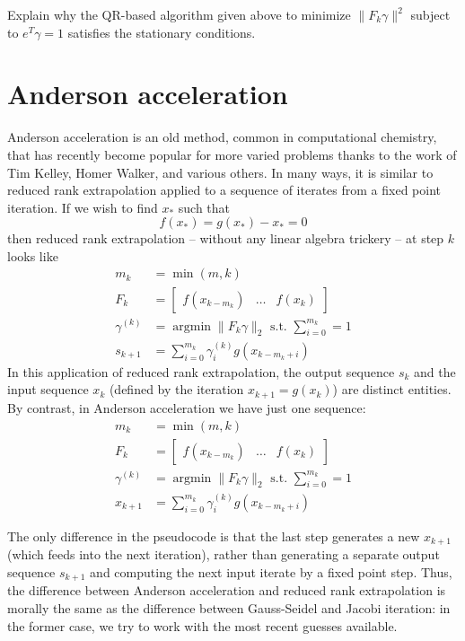 \documentclass[12pt, leqno]{article} %
\begin{document}
Explain why the QR-based algorithm given above to minimize
\(\|F_k \gamma\|^2\) subject to \(e^T \gamma = 1\) satisfies the
stationary conditions.

\section{Anderson acceleration}

Anderson acceleration is an old method, common in computational
chemistry, that has recently become popular for more varied problems
thanks to the work of Tim Kelley, Homer Walker, and various others. In
many ways, it is similar to reduced rank extrapolation applied to a
sequence of iterates from a fixed point iteration. If we wish to find
\(x_*\) such that \[f(x_*) = g(x_*)-x_* = 0\] then reduced rank
extrapolation -- without any linear algebra trickery -- at step \(k\)
looks like \begin{align*}
  m_k &= \min(m,k) \\
  F_k &= \begin{bmatrix} f(x_{k-m_k}) & \ldots & f(x_k) \end{bmatrix} \\
  \gamma^{(k)} &= \operatorname{argmin} \|F_k \gamma\|_2 \mbox{ s.t. } \sum_{i=0}^{m_k} = 1 \\
  s_{k+1} &= \sum_{i=0}^{m_k} \gamma_i^{(k)} g(x_{k-m_k+i})
\end{align*} In this application of reduced rank extrapolation, the
output sequence \(s_k\) and the input sequence \(x_k\) (defined by the
iteration \(x_{k+1} = g(x_k)\)) are distinct entities. By contrast, in
Anderson acceleration we have just one sequence: \begin{align*}
  m_k &= \min(m,k) \\
  F_k &= \begin{bmatrix} f(x_{k-m_k}) & \ldots & f(x_k) \end{bmatrix} \\
  \gamma^{(k)} &= \operatorname{argmin} \|F_k \gamma\|_2 \mbox{ s.t. } \sum_{i=0}^{m_k} = 1 \\
  x_{k+1} &= \sum_{i=0}^{m_k} \gamma_i^{(k)} g(x_{k-m_k+i})
\end{align*}

The only difference in the pseudocode is that the last step generates a
new \(x_{k+1}\) (which feeds into the next iteration), rather than
generating a separate output sequence \(s_{k+1}\) and computing the next
input iterate by a fixed point step. Thus, the difference between
Anderson acceleration and reduced rank extrapolation is morally the same
as the difference between Gauss-Seidel and Jacobi iteration: in the
former case, we try to work with the most recent guesses available.
\end{document}
